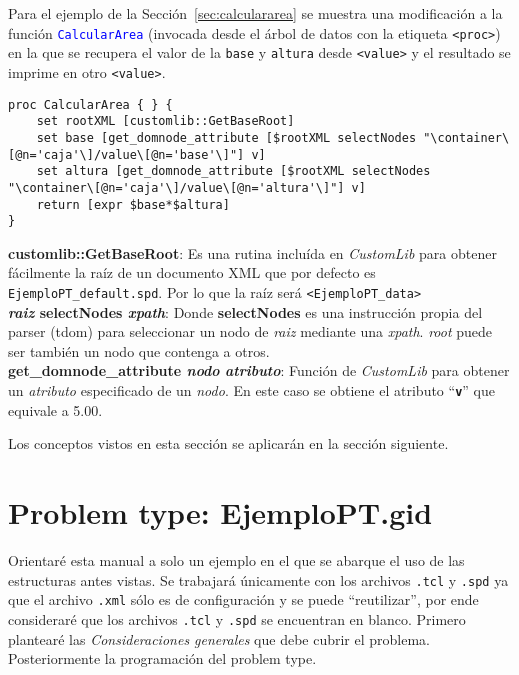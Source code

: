 \documentclass[10pt, a4paper, twocolumn]{article} %
\begin{document}
Para el ejemplo de la Sección~\ref{sec:calculararea} se muestra una modificación a la función \textcolor{blue}{\texttt{CalcularArea}} (invocada desde el árbol de datos con la etiqueta \texttt{<proc>}) en la que se recupera el valor de la \texttt{base} y \texttt{altura} desde \texttt{<value>} y el resultado se imprime en otro \texttt{<value>}.

\lstset{language=tcl} 
\begin{lstlisting}[caption={Cálculo del área obteniendo los valores desde el archivo \texttt{.spd} usando las funciones de \texttt{CustomLib}.}]
proc CalcularArea { } {
	set rootXML [customlib::GetBaseRoot]
	set base [get_domnode_attribute [$rootXML selectNodes "\container\[@n='caja'\]/value\[@n='base'\]"] v]
	set altura [get_domnode_attribute [$rootXML selectNodes "\container\[@n='caja'\]/value\[@n='altura'\]"] v]
	return [expr $base*$altura]
}
\end{lstlisting} 

\textbf{customlib::GetBaseRoot}: Es una rutina incluída en \textit{CustomLib} para obtener fácilmente la raíz de un documento XML que por defecto es \texttt{EjemploPT\_default.spd}. Por lo que la raíz será \texttt{<EjemploPT\_data>}\\
\textbf{\textit{raiz} selectNodes \textit{xpath}}: Donde \textbf{selectNodes} es una instrucción propia del parser (tdom) para seleccionar un nodo de \textit{raiz} mediante una \textit{xpath}. \textit{root} puede ser también un nodo que contenga a otros.\\
\textbf{get\_domnode\_attribute \textit{nodo} \textit{atributo}}: Función  de \textit{CustomLib} para obtener un \textit{atributo} especificado de un \textit{nodo}. En este caso se obtiene el atributo ``\texttt{\textbf{v}}'' que equivale a 5.00.

Los conceptos vistos en esta sección se aplicarán en la sección siguiente.

\section{Problem type: EjemploPT.gid}

Orientaré esta manual a solo un ejemplo en el que se abarque el uso de las estructuras antes vistas. Se trabajará únicamente con los archivos \texttt{.tcl} y \texttt{.spd} ya que el archivo \texttt{.xml} sólo es de configuración y se puede ``reutilizar'', por ende consideraré que los archivos \texttt{.tcl} y \texttt{.spd} se encuentran en blanco. Primero plantearé las \textit{Consideraciones generales} que debe cubrir el problema. Posteriormente la programación del problem type. 
\end{document}
